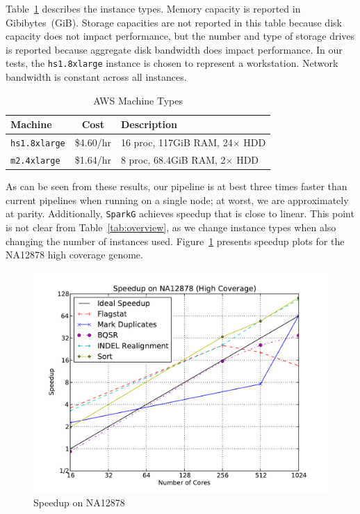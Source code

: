\documentclass{acm_proc_article-sp}
\begin{document}
Table~\ref{tab:machines} describes the instance types. Memory capacity is reported in Gibibytes~(GiB).
Storage capacities are not reported in this table because disk
capacity does not impact performance, but the number and type of storage drives is reported because
aggregate disk bandwidth does impact performance. In our tests, the \texttt{hs1.8xlarge} instance is
chosen to represent a workstation. Network bandwidth is constant across all instances.

\begin{table}[h]
\caption{AWS Machine Types}
\label{tab:machines}
\begin{tabular}{ l c l }
\hline
\bf Machine & \bf Cost & \bf Description \\
\hline
\hline
\texttt{hs1.8xlarge} & \$4.60/hr & 16 proc, 117GiB RAM, 24$\times$ HDD \\
\texttt{m2.4xlarge} & \$1.64/hr & 8 proc, 68.4GiB RAM, 2$\times$ HDD \\
\hline
\end{tabular}
\end{table}

As can be seen from these results, our pipeline is at best three times faster than current pipelines when running
on a single node; at worst, we are approximately at parity. Additionally, \texttt{SparkG} achieves speedup that is
close to linear. This point is not clear from Table~\ref{tab:overview}, as we change instance types when also
changing the number of instances used. Figure~\ref{fig:speedup} presents speedup plots for the NA12878 high
coverage genome.

\begin{figure}[h]
\begin{center}
\includegraphics[width=0.99\linewidth]{graphs/speedup_na12878.pdf}
\end{center}
\caption{Speedup on NA12878}
\label{fig:speedup}
\end{figure}
\end{document}
